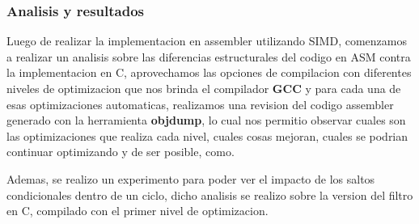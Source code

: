\begin{itemize}
\end{itemize}

\subsubsection{Analisis y resultados}
Luego de realizar la implementacion en assembler utilizando SIMD, comenzamos a realizar un analisis sobre las diferencias estructurales del codigo en ASM contra la implementacion en C, aprovechamos las opciones de compilacion con diferentes niveles de optimizacion que nos brinda el compilador \textbf{GCC} y para cada una de esas optimizaciones automaticas, realizamos una revision del codigo assembler generado con la herramienta \textbf{objdump}, lo cual nos permitio observar cuales son las optimizaciones que realiza cada nivel, cuales cosas mejoran, cuales se podrian continuar optimizando y de ser posible, como.\\
\par
Ademas, se realizo un experimento para poder ver el impacto de los saltos condicionales dentro de un ciclo, dicho analisis se realizo sobre la version del filtro en C, compilado con el primer nivel de optimizacion.

